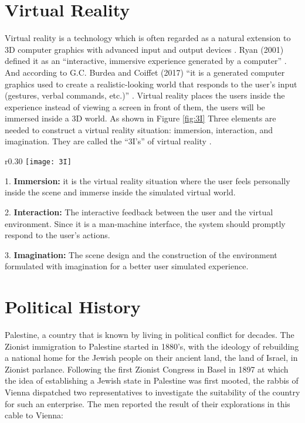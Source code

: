 \section{Virtual Reality}
Virtual reality is a technology which is often regarded as a natural extension to 3D computer graphics with advanced input and output devices \citep{Jayaram1997}. Ryan (2001) defined it as an “interactive, immersive experience generated by a computer” \citep{Ryan2001}. And according to G.C. Burdea and Coiffet (2017) “it is a generated computer graphics used to create a realistic-looking world that responds to the user’s input (gestures, verbal commands, etc.)” \citep{burdea2017virtual}. Virtual reality places the users inside the experience instead of viewing a screen in front of them, the users will be immersed inside a 3D world. As shown in Figure \ref{fig:3I} Three elements are needed to construct a virtual reality situation: immersion, interaction, and imagination. They are called the “3I’s” of virtual reality \citep{Hu2016}.


\begin{wrapfigure}{r}{0.30\textwidth} %
    \centering
    \texttt{[image: 3I]}
    \caption{The 3I's of Virtual Reality - © 2003 by John Wiley \& Sons Inc. All rights
reserved}
    \label{fig:3I}
\end{wrapfigure}

1. \textbf{Immersion:} it is the virtual reality situation where the user feels personally inside the
scene and immerse inside the simulated virtual world.



2. \textbf{Interaction:} The interactive feedback between the user
and the virtual environment. Since it is a man-machine
interface, the system should promptly respond to the
user’s actions.


3. \textbf{Imagination:} The scene design and the construction of
the environment formulated with imagination for a
better user simulated experience.



\section{Political History}
Palestine, a country that is known by living in political conflict for decades.
The Zionist immigration to Palestine started in 1880's, with the ideology of rebuilding a national home for the Jewish people on their ancient land, the land of Israel, in Zionist parlance\citep{Morris2004}\citep{Pappe2006}\citep{Khalidi2015}.
Following the first Zionist Congress in Basel in 1897 at which the idea of
establishing a Jewish state in Palestine was first mooted, the rabbis of Vienna
dispatched two representatives to investigate the suitability of the country for
such an enterprise. The men reported the result of their explorations in this cable
to Vienna:




